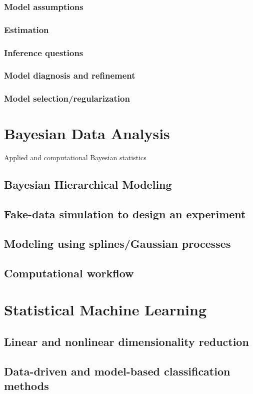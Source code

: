 \documentclass{article}
\begin{document}
\subsubsection{Model assumptions}
\subsubsection{Estimation}
\subsubsection{Inference questions}
\subsubsection{Model diagnosis and refinement}
\subsubsection{Model selection/regularization}

\section{Bayesian Data Analysis}
Applied and computational Bayesian statistics
\subsection{Bayesian Hierarchical Modeling}
\subsection{Fake-data simulation to design an experiment}
\subsection{Modeling using splines/Gaussian processes}
\subsection{Computational workflow}

\section{Statistical Machine Learning}
\subsection{Linear and nonlinear dimensionality reduction}
\subsection{Data-driven and model-based classification methods}
\end{document}
